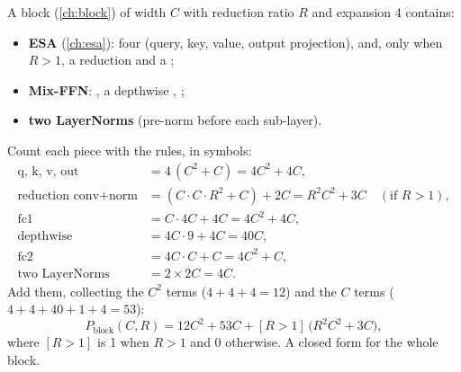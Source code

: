 A block (\cref{ch:block}) of width $C$ with reduction ratio $R$ and expansion 4 contains:
\begin{itemize}
\item \textbf{ESA} (\cref{ch:esa}): four  (query, key, value, output projection),
and, only when $R > 1$, a reduction  and a ;
\item \textbf{Mix-FFN}: , a depthwise , ;
\item \textbf{two LayerNorms} (pre-norm before each sub-layer).
\end{itemize}
Count each piece with the rules, in symbols:
\begin{align*}
\text{q, k, v, out} &= 4\,(C^2 + C) = 4C^2 + 4C,\\
\text{reduction conv} + \text{norm} &= (C \cdot C \cdot R^2 + C) + 2C = R^2 C^2 + 3C \quad (\text{if } R > 1),\\
\text{fc1} &= C \cdot 4C + 4C = 4C^2 + 4C,\\
\text{depthwise} &= 4C \cdot 9 + 4C = 40C,\\
\text{fc2} &= 4C \cdot C + C = 4C^2 + C,\\
\text{two LayerNorms} &= 2 \times 2C = 4C .
\end{align*}
Add them, collecting the $C^2$ terms ($4 + 4 + 4 = 12$) and the $C$ terms ($4 + 4 + 40 + 1 + 4 = 53$):
\begin{equation}\label{eq:params:block}
P_{\text{block}}(C, R) = 12 C^2 + 53 C + [R > 1]\,\big(R^2 C^2 + 3C\big),
\end{equation}
where $[R > 1]$ is 1 when $R > 1$ and 0 otherwise. A closed form for the whole block.

